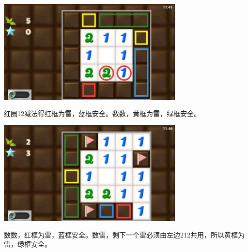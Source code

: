 \subsection{} %
\begin{center}
    \includegraphics[width=0.7\textwidth]{puzzlelow/16-1.jpg}
\end{center}
红圈12减法得红框为雷，蓝框安全。数数，黄框为雷，绿框安全。
\begin{center}
    \includegraphics[width=0.7\textwidth]{puzzlelow/16-2.jpg}
\end{center}
数数，红框为雷，蓝框安全。数雷，剩下一个雷必须由左边212共用，所以黄框为雷，绿框安全。

